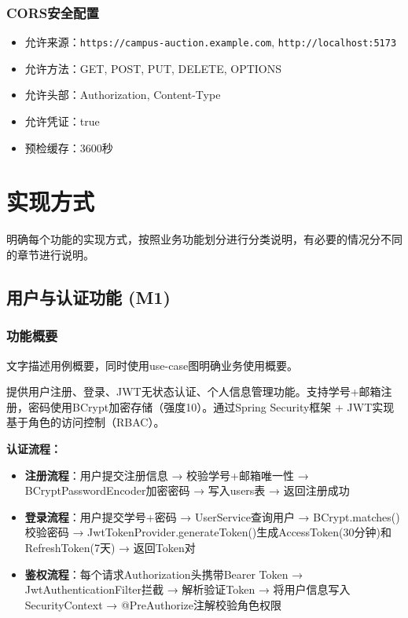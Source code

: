 \documentclass[12pt,a4paper]{ctexart}
\numberwithin{figure}{section}
\numberwithin{table}{section}
\begin{document}
\subsubsection{CORS安全配置}

\begin{itemize}
    \item 允许来源：\verb|https://campus-auction.example.com|, \verb|http://localhost:5173|
    \item 允许方法：GET, POST, PUT, DELETE, OPTIONS
    \item 允许头部：Authorization, Content-Type
    \item 允许凭证：true
    \item 预检缓存：3600秒
\end{itemize}

\section{实现方式}

明确每个功能的实现方式，按照业务功能划分进行分类说明，有必要的情况分不同的章节进行说明。

\subsection{用户与认证功能 (M1)}

\subsubsection{功能概要}

文字描述用例概要，同时使用use-case图明确业务使用概要。

提供用户注册、登录、JWT无状态认证、个人信息管理功能。支持学号+邮箱注册，密码使用BCrypt加密存储（强度10）。通过Spring Security框架 + JWT实现基于角色的访问控制（RBAC）。

\textbf{认证流程：}

\begin{itemize}
    \item \textbf{注册流程}：用户提交注册信息 → 校验学号+邮箱唯一性 → BCryptPasswordEncoder加密密码 → 写入users表 → 返回注册成功
    \item \textbf{登录流程}：用户提交学号+密码 → UserService查询用户 → BCrypt.matches()校验密码 → JwtTokenProvider.generateToken()生成AccessToken(30分钟)和RefreshToken(7天) → 返回Token对
    \item \textbf{鉴权流程}：每个请求Authorization头携带Bearer Token → JwtAuthenticationFilter拦截 → 解析验证Token → 将用户信息写入SecurityContext → @PreAuthorize注解校验角色权限
\end{itemize}
\end{document}
